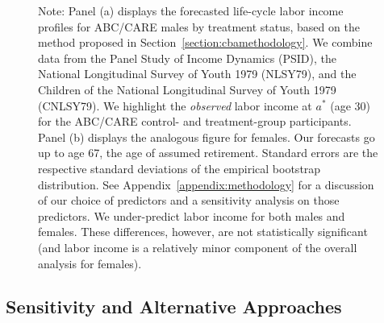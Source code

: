 \begin{figure}
Note: Panel (a) displays the forecasted life-cycle labor income profiles for ABC/CARE males by treatment status, based on the method proposed in Section~\ref{section:cbamethodology}. We combine data from the Panel Study of Income Dynamics (PSID), the National Longitudinal Survey of Youth 1979 (NLSY79), and the Children of the National Longitudinal Survey of Youth 1979 (CNLSY79). We highlight the \textit{observed} labor income at $a^*$ (age 30) for the ABC/CARE control- and treatment-group participants. Panel (b) displays the analogous figure for females. Our forecasts go up to age 67, the age of assumed retirement. Standard errors are the respective standard deviations of the empirical bootstrap distribution. See  Appendix~\ref{appendix:methodology} for a discussion of our choice of predictors and a sensitivity analysis on those predictors. We under-predict labor income for both males and females. These differences, however, are not statistically significant (and labor income is a relatively minor component of the overall analysis for females).
\end{figure}

\subsection{Sensitivity and Alternative Approaches} \label{section:sens}

